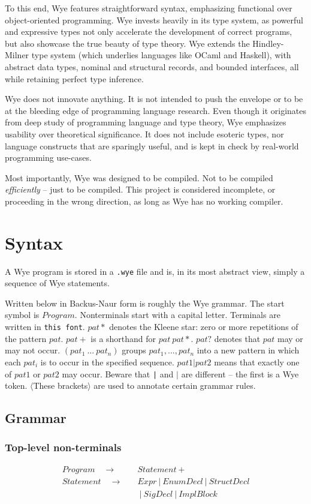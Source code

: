 \documentclass[a4paper, 12pt]{article}
\newcommand{\sepbar}{\: | \:}	%
\newcommand{\substo}{\quad\rightarrow\quad}
\renewcommand{\tt}{\texttt}
\newcommand{\la}{\langle}
\newcommand{\ra}{\rangle}
\begin{document}
To this end, Wye features straightforward syntax, emphasizing functional over
object-oriented programming. Wye invests heavily in its type system, as powerful and expressive
types not only accelerate  the development of correct programs, but also showcase the true
beauty of type theory. Wye extends the Hindley-Milner type system (which
underlies languages like OCaml and Haskell), with abstract data types, nominal and structural
records, and bounded interfaces, all while retaining perfect type inference.

Wye does not innovate anything. It is not intended to push the envelope
or to be at the bleeding edge of programming language research. Even though it originates
from deep study of programming language and type theory, Wye emphasizes usability over
theoretical significance.
It does not include esoteric types, nor language constructs that are
sparingly useful, and is kept in check by real-world programming use-cases.

Most importantly, Wye was designed to be compiled. Not to be compiled \textit{efficiently} --
just to be compiled. This project is considered incomplete, or proceeding in the wrong direction,
as long as Wye has no working compiler.

\section{Syntax}
A Wye program is stored in a \tt{.wye} file and is, in its most abstract
view, simply a sequence of Wye statements.

Written below in Backus-Naur form is roughly the Wye grammar. The start symbol is
$Program$. Nonterminals start with a capital letter. Terminals are written in
\tt{this font}. $pat*$ denotes the Kleene star: zero or more repetitions of
the pattern $pat$. $pat+$ is a shorthand for $pat\: pat*$. $pat?$ denotes that
$pat$ may or may not occur. $( pat_1\:...\: pat_n )$ groups $pat_1, ..., pat_n$
into a new pattern in which each $pat_i$ is to occur in the specified sequence.
$pat1 | pat2$ means that exactly one of $pat1$ or $pat2$ may occur. Beware that
\tt{|} and $|$ are different -- the first is a Wye token. $\la$These
brackets$\ra$ are used to annotate certain grammar rules.

\subsection{Grammar}
\subsubsection{Top-level non-terminals}
\begin{align*}
Program \substo& Statement+\\
Statement \substo& Expr \sepbar EnumDecl \sepbar StructDecl\\
&\sepbar SigDecl \sepbar ImplBlock
\end{align*}
\end{document}
